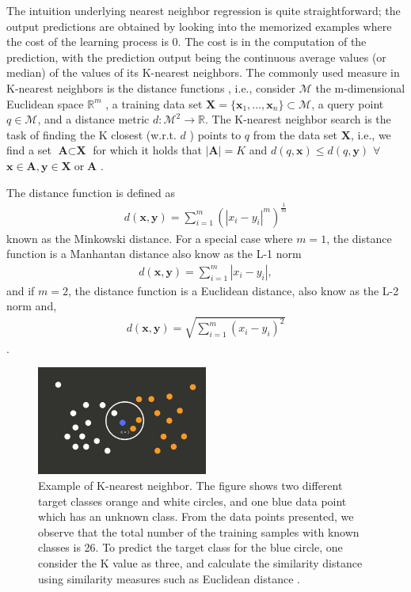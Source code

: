 The intuition underlying nearest neighbor regression is quite straightforward;
the output predictions are obtained by looking into the memorized examples where the cost of the learning process is 0. The cost is in the computation of the prediction, with the prediction output being the continuous average values (or median) of the values of its K-nearest neighbors. The commonly used measure in K-nearest neighbors is the distance functions , i.e., consider $\mathcal{M}$ the m-dimensional Euclidean space $\mathbb{R}^m$  , a training data set $\textbf{X}=\{\textbf{x}_1,\dots, \textbf{x}_n\} \subset \mathcal{M}$, a query point $q\in \mathcal{M}$, and a distance metric $d:\mathcal{M}^2 \rightarrow \mathbb{R}$. The K-nearest neighbor search is the task of finding  the K closest (w.r.t. $d$ ) points to $q$ from the data set $\textbf{X}$, i.e., we find a set $\textbf{A} \subset \textbf{X}$ for which it holds  that $|\textbf{A}|= K$ and  $d(q,\textbf{x})\leq d(q,\textbf{y})$ $\forall$ $\textbf{x}\in \textbf{A}, \textbf{y}\in \textbf{X} \;\text{or}\; \textbf{A}$ \citep{hyvonen2015fast}. 

The distance function is defined as 
\begin{align}
d(\textbf{x},\textbf{y})= \sum_{i=1}^m \left(|x_i -y_i|^m\right)^{\frac{1}{m}}
\end{align}
known as the Minkowski distance. For a special case where $m=1$, the distance function is a Manhantan distance also know as the L-1 norm
\begin{align}
d(\textbf{x},\textbf{y})= \sum_{i=1}^m|x_i -y_i|,
\end{align}
and if $m=2$, the distance function is a Euclidean distance, also know as the L-2 norm and, 
\begin{align}
d(\textbf{x},\textbf{y})= \sqrt{\sum_{i=1}^m \left(x_i -y_i \right)^2}
\end{align}
\citep{cunningham2007k}.

\begin{figure}[H]
  \centering
    \includegraphics[width=0.5\textwidth]{images/Kn.jpg}
    \caption{Example of K-nearest neighbor. The figure shows  two different target classes orange and white circles, and one blue data point which has an unknown class. From the data points presented, we observe that the total number of the training samples  with known classes is 26. To predict the target class for the blue circle, one consider the K value as three, and calculate the similarity distance using similarity measures such as Euclidean distance \citep{K-NNALGORITHM}.}
  \label{kn}
\end{figure}

